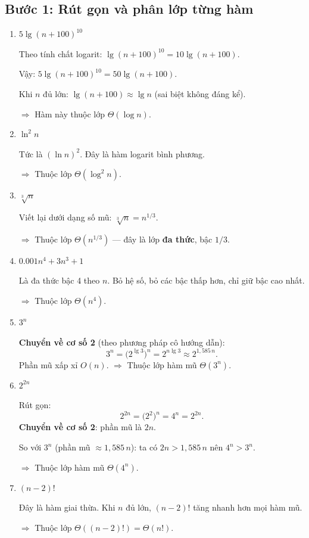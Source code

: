 ﻿\documentclass[12pt,a4paper]{article}
\begin{document}
\subsection{Bước 1: Rút gọn và phân lớp từng hàm}

\begin{enumerate}[label=\textbf{\arabic*.}]

  \item $5\lg(n+100)^{10}$

  Theo tính chất logarit: $\lg(n+100)^{10} = 10\lg(n+100)$.

  Vậy: $5\lg(n+100)^{10} = 50\lg(n+100)$.

  Khi $n$ đủ lớn: $\lg(n+100) \approx \lg n$ (sai biệt không đáng kể).

  $\Longrightarrow$ Hàm này thuộc lớp $\Theta(\log n)$.

  \item $\ln^2 n$

  Tức là $(\ln n)^2$. Đây là hàm logarit bình phương.

  $\Longrightarrow$ Thuộc lớp $\Theta(\log^2 n)$.

  \item $\sqrt[3]{n}$

  Viết lại dưới dạng số mũ: $\sqrt[3]{n} = n^{1/3}$.

  $\Longrightarrow$ Thuộc lớp $\Theta(n^{1/3})$ --- đây là lớp \textbf{đa thức}, bậc $1/3$.

  \item $0.001n^4 + 3n^3 + 1$

  Là đa thức bậc 4 theo $n$. Bỏ hệ số, bỏ các bậc thấp hơn, chỉ giữ bậc cao nhất.

  $\Longrightarrow$ Thuộc lớp $\Theta(n^4)$.

  \item $3^n$

  \textbf{Chuyển về cơ số 2} (theo phương pháp cô hướng dẫn):
  \[
    3^n = \bigl(2^{\lg 3}\bigr)^n = 2^{n\lg 3} \approx 2^{1{,}585\,n}.
  \]
  Phần mũ xấp xỉ $O(n)$. $\Longrightarrow$ Thuộc lớp hàm mũ $\Theta(3^n)$.

  \item $2^{2n}$

  Rút gọn:
  \[
    2^{2n} = \bigl(2^2\bigr)^n = 4^n = 2^{2n}.
  \]
  \textbf{Chuyển về cơ số 2}: phần mũ là $2n$.

  So với $3^n$ (phần mũ $\approx 1{,}585\,n$): ta có $2n > 1{,}585\,n$ nên $4^n > 3^n$.

  $\Longrightarrow$ Thuộc lớp hàm mũ $\Theta(4^n)$.

  \item $(n-2)!$

  Đây là hàm giai thừa. Khi $n$ đủ lớn, $(n-2)!$ tăng nhanh hơn mọi hàm mũ.

  $\Longrightarrow$ Thuộc lớp $\Theta((n-2)!) = \Theta(n!)$.

\end{enumerate}
\end{document}
